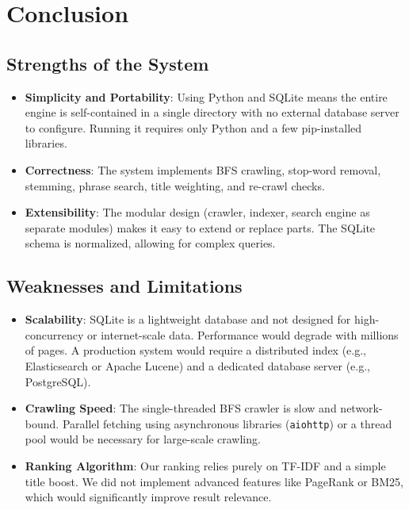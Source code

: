 \documentclass[11pt,a4paper]{article}
\begin{document}
\section{Conclusion}

\subsection{Strengths of the System}
\begin{itemize}
    \item \textbf{Simplicity and Portability}: Using Python and SQLite means the entire engine is self-contained in a single directory with no external database server to configure. Running it requires only Python and a few pip-installed libraries.
    \item \textbf{Correctness}: The system implements BFS crawling, stop-word removal, stemming, phrase search, title weighting, and re-crawl checks.
    \item \textbf{Extensibility}: The modular design (crawler, indexer, search engine as separate modules) makes it easy to extend or replace parts. The SQLite schema is normalized, allowing for complex queries.
\end{itemize}

\subsection{Weaknesses and Limitations}
\begin{itemize}
    \item \textbf{Scalability}: SQLite is a lightweight database and not designed for high-concurrency or internet-scale data. Performance would degrade with millions of pages. A production system would require a distributed index (e.g., Elasticsearch or Apache Lucene) and a dedicated database server (e.g., PostgreSQL).
    \item \textbf{Crawling Speed}: The single-threaded BFS crawler is slow and network-bound. Parallel fetching using asynchronous libraries (\texttt{aiohttp}) or a thread pool would be necessary for large-scale crawling.
    \item \textbf{Ranking Algorithm}: Our ranking relies purely on TF-IDF and a simple title boost. We did not implement advanced features like PageRank or BM25, which would significantly improve result relevance.
\end{itemize}
\end{document}
